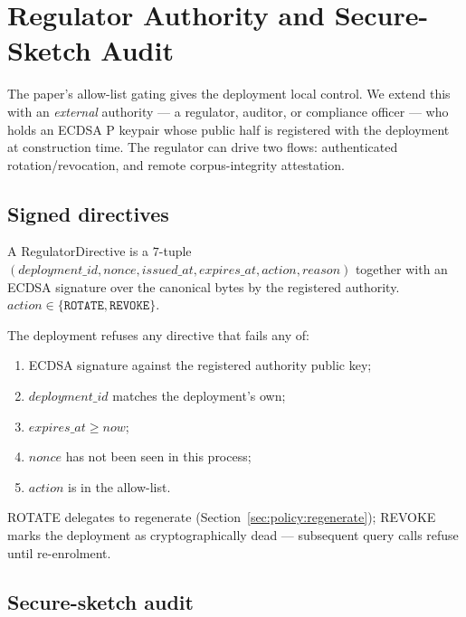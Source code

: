 \documentclass[11pt,a4paper]{article}
\begin{document}
\section{Regulator Authority and Secure-Sketch Audit}
\label{sec:regulator}

The paper's allow\nobreakdash-list gating gives the deployment local
control.  We extend this with an \emph{external} authority — a
regulator, auditor, or compliance officer — who holds an ECDSA
P keypair whose public half is registered with the
deployment at construction time.  The regulator can drive two flows:
authenticated rotation/revocation, and remote corpus\nobreakdash-integrity
attestation.

\subsection{Signed directives}
\label{sec:regulator:directives}

A \textsf{RegulatorDirective} is a $7$\nobreakdash-tuple
$(\mathit{deployment\_id}, \mathit{nonce}, \mathit{issued\_at},
\mathit{expires\_at}, \mathit{action}, \mathit{reason})$ together
with an ECDSA signature over the canonical bytes by the registered
authority.  $\mathit{action} \in \{\texttt{ROTATE}, \texttt{REVOKE}\}$.

The deployment refuses any directive that fails any of:

\begin{enumerate}
  \item ECDSA signature against the registered authority public key;
  \item $\mathit{deployment\_id}$ matches the deployment's own;
  \item $\mathit{expires\_at} \geq \mathit{now}$;
  \item $\mathit{nonce}$ has not been seen in this process;
  \item $\mathit{action}$ is in the allow\nobreakdash-list.
\end{enumerate}

\textsf{ROTATE} delegates to \textsf{regenerate}
(Section~\ref{sec:policy:regenerate}); \textsf{REVOKE} marks the
deployment as cryptographically dead — subsequent
\textsf{query} calls refuse until re\nobreakdash-enrolment.

\subsection{Secure-sketch audit}
\label{sec:regulator:audit}
\end{document}
